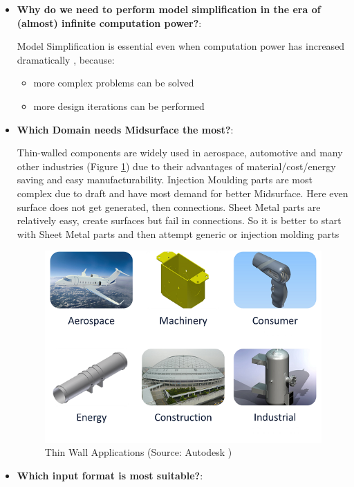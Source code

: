 \begin{itemize}[noitemsep,topsep=2pt,parsep=2pt,partopsep=2pt,leftmargin=*]
\item \textbf{Why do we need to perform model simplification in the era of (almost) infinite computation power?}:


Model Simplification is essential even when computation power has increased dramatically \cite{Stolt2005}, because:
	\begin{itemize}[noitemsep,topsep=2pt,parsep=2pt,partopsep=2pt,leftmargin=*]
	\item more complex problems can be solved
	\item more design iterations can be performed
	\end{itemize}
	
	
\item \textbf{Which Domain needs Midsurface the most?}: 

Thin-walled components are widely used in aerospace, automotive and many other industries (Figure \ref{fig:litsurvey:ThinWallApplications}) due to their advantages of material/cost/energy saving and easy manufacturability.  Injection Moulding parts are most complex due to draft and have most demand for better Midsurface. Here even surface does not get generated, then connections. Sheet Metal parts are relatively easy, create surfaces but fail in connections. So it is better to start with Sheet Metal parts and then attempt generic or injection molding parts



	\begin{figure} [!h]
		\centering
		\includegraphics[width=0.6\linewidth]{..//Common/images/ThinWallApplications}
		\caption{Thin Wall Applications (Source: Autodesk \cite{SheetMetalAutodesk})}
		\label{fig:litsurvey:ThinWallApplications}
	\end{figure}
	


\item \textbf{Which input format is most suitable?}: 


\end{itemize}
